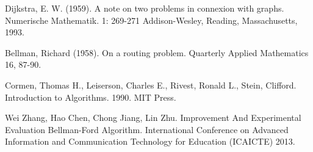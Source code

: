 \documentclass[a4paper]{article}
\begin{document}

\begin{thebibliography}{9}

Dijkstra, E. W. (1959). A note on two problems in connexion with graphs. Numerische Mathematik. 1: 269-271
Addison-Wesley, Reading, Massachusetts, 1993.
 
Bellman, Richard (1958). On a routing problem. Quarterly Applied Mathematics 16, 87-90. 
 
Cormen, Thomas H., Leiserson, Charles E., Rivest, Ronald L., Stein, Clifford. Introduction to Algorithms. 1990. MIT Press.

Wei Zhang, Hao Chen, Chong Jiang, Lin Zhu.
Improvement And Experimental Evaluation Bellman-Ford Algorithm.
International Conference on Advanced Information and Communication Technology for Education (ICAICTE) 2013.

\end{thebibliography}
\end{document}
